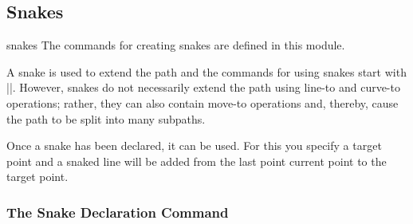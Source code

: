 \subsection{Snakes}

\label{section-base-snakes}

\begin{pgfmodule}{snakes}
  The commands for creating snakes are defined in this module.
\end{pgfmodule}

A snake is used to extend the path and the
commands for using snakes start with |\pgfpath|. However, snakes do
not necessarily extend the path using line-to and curve-to operations;
rather, they can also contain move-to operations and, thereby, cause
the path to be split into many subpaths.

Once a snake has been declared, it can be used. For this you specify a
target point and a snaked line will be added from the last point
current point to the target point.

\subsubsection{The Snake Declaration Command}

